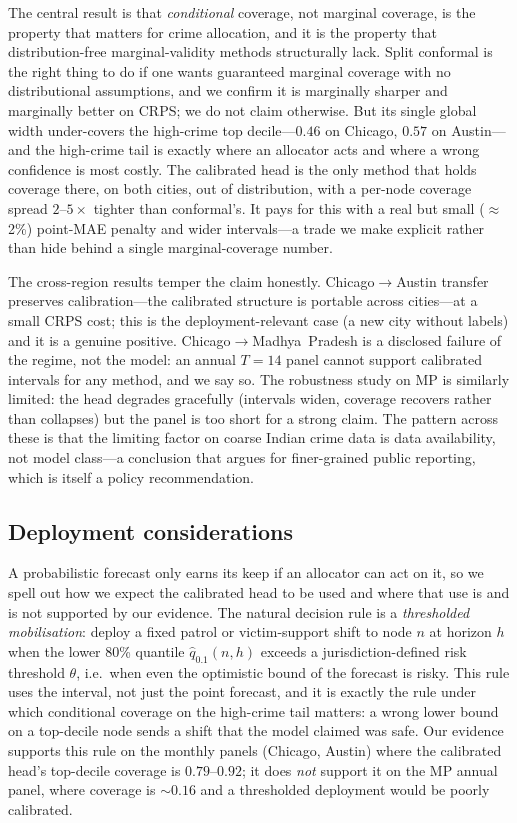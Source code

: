 \documentclass[11pt,conference]{IEEEtran}
\begin{document}
The central result is that \emph{conditional} coverage, not marginal coverage, is
the property that matters for crime allocation, and it is the property that
distribution-free marginal-validity methods structurally lack. Split conformal is
the right thing to do if one wants guaranteed marginal coverage with no
distributional assumptions, and we confirm it is marginally sharper and
marginally better on CRPS; we do not claim otherwise. But its single global width
under-covers the high-crime top decile---$0.46$ on Chicago, $0.57$ on Austin---and
the high-crime tail is exactly where an allocator acts and where a wrong
confidence is most costly. The calibrated head is the only method that holds
coverage there, on both cities, out of distribution, with a per-node coverage
spread $2$--$5\times$ tighter than conformal's. It pays for this with a real but
small ($\approx$2\%) point-MAE penalty and wider intervals---a trade we make
explicit rather than hide behind a single marginal-coverage number.

The cross-region results temper the claim honestly. Chicago$\to$Austin transfer
preserves calibration---the calibrated structure is portable across cities---at a
small CRPS cost; this is the deployment-relevant case (a new city without labels)
and it is a genuine positive. Chicago$\to$Madhya~Pradesh is a disclosed failure
of the regime, not the model: an annual $T{=}14$ panel cannot support calibrated
intervals for any method, and we say so. The robustness study on MP is similarly
limited: the head degrades gracefully (intervals widen, coverage recovers rather
than collapses) but the panel is too short for a strong claim. The pattern across
these is that the limiting factor on coarse Indian crime data is data
availability, not model class---a conclusion that argues for finer-grained public
reporting, which is itself a policy recommendation.

\subsection{Deployment considerations}\label{sec:deploy}
A probabilistic forecast only earns its keep if an allocator can act on it, so we
spell out how we expect the calibrated head to be used and where that use is and
is not supported by our evidence. The natural decision rule is a
\emph{thresholded mobilisation}: deploy a fixed patrol or victim-support shift to
node $n$ at horizon $h$ when the lower 80\% quantile $\hat q_{0.1}(n,h)$ exceeds
a jurisdiction-defined risk threshold $\theta$, i.e.\ when even the optimistic
bound of the forecast is risky. This rule uses the interval, not just the point
forecast, and it is exactly the rule under which conditional coverage on the
high-crime tail matters: a wrong lower bound on a top-decile node sends a shift
that the model claimed was safe. Our evidence supports this rule on the monthly
panels (Chicago, Austin) where the calibrated head's top-decile coverage is
$0.79$--$0.92$; it does \emph{not} support it on the MP annual panel, where
coverage is $\sim0.16$ and a thresholded deployment would be poorly calibrated.
\end{document}
